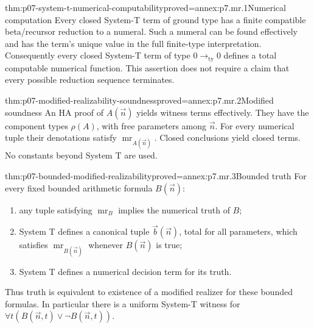 
\begin{hblemma}{thm:p07-system-t-numerical-computability}{proved=annex:p7.mr.1}{Numerical computation}
Every closed System-T term of ground type has a finite compatible
beta/recursor reduction to a numeral. Such a numeral can be found
effectively and has the term's unique value in the full finite-type
interpretation. Consequently every closed System-T term of type
\(0\to_{\mathrm{ty}}0\) defines a total computable numerical
function. This assertion does not require a claim that every possible
reduction sequence terminates.
\end{hblemma}

\begin{hbtheorem}{thm:p07-modified-realizability-soundness}{proved=annex:p7.mr.2}{Modified soundness}
An HA proof of \(A(\vec n)\) yields witness terms effectively.
They have the component types \(\rho(A)\), with free parameters
among \(\vec n\). For every numerical tuple their denotations satisfy
\(\operatorname{mr}_{A(\vec n)}\). Closed conclusions yield closed
terms. No constants beyond System T are used.
\end{hbtheorem}

\begin{hblemma}{thm:p07-bounded-modified-realizability}{proved=annex:p7.mr.3}{Bounded truth}
For every fixed bounded arithmetic formula \(B(\vec n)\):
\begin{enumerate}
\item any tuple satisfying \(\operatorname{mr}_B\) implies the
      numerical truth of \(B\);
\item System T defines a canonical tuple \(\vec b(\vec n)\),
      total for all parameters, which satisfies
      \(\operatorname{mr}_{B(\vec n)}\) whenever \(B(\vec n)\)
      is true;
\item System T defines a numerical decision term for its truth.
\end{enumerate}
Thus truth is equivalent to existence of a modified realizer for these
bounded formulas. In particular there is a uniform System-T witness
for \(\forall t(B(\vec n,t)\lor\neg B(\vec n,t))\).
\end{hblemma}
